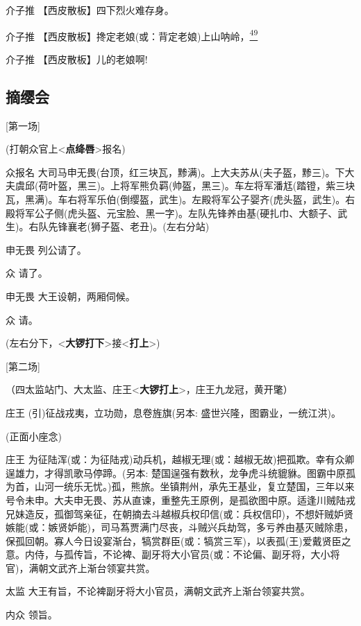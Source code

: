 介子推 【西皮散板】四下烈火难存身。

介子推
【西皮散板】搀定老娘(或：背定老娘)上山呐岭，\protect\hyperlink{fn49}{\textsuperscript{49}}

介子推 【西皮散板】儿的老娘啊!

\newpage
\hypertarget{ux6458ux7f28ux4f1a}{%
\subsection{摘缨会}\label{ux6458ux7f28ux4f1a}}

{[}第一场{]}

(打朝众官上\textless{}\textbf{点绛唇}\textgreater{}报名)

众报名
大司马申无畏(台顶，红三块瓦，黪满)。上大夫苏从(夫子盔，黪三)。下大夫虞邱(荷叶盔，黑三)。上将军熊负羁(帅盔，黑三)。车左将军潘尪(踏镫，紫三块瓦，黑满)。车右将军乐伯(倒缨盔，武生)。左殿将军公子婴齐(虎头盔，武生)。右殿将军公子侧(虎头盔、元宝脸、黑一字)。左队先锋养由基(硬扎巾、大额子、武生)。右队先锋襄老(狮子盔、老丑)。(左右分站)

申无畏 列公请了。

众 请了。

申无畏 大王设朝，两厢伺候。

众 请。

(左右分下，\textless{}\textbf{大锣打下}\textgreater{}接\textless{}\textbf{打上}\textgreater{})

{[}第二场{]}

（四太监站门、大太监、庄王\textless{}\textbf{大锣打上}\textgreater{}，庄王九龙冠，黄开氅）

庄王 (引)征战戎夷，立功勋，息卷旌旗(另本: 盛世兴隆，图霸业，一统江洪)。

(正面小座念)

庄王
为征陆浑(或：为征陆戎)动兵机，越椒无理(或：越椒无故)把孤欺。幸有众卿逞雄力，才得凯歌马停蹄。(另本:
楚国逞强有数秋，龙争虎斗统貔貅。图霸中原孤为首，山河一统乐无忧。)孤，熊旅。坐镇荆州，承先王基业，复立楚国，三年以来号令未申。大夫申无畏、苏从直谏，重整先王原例，是孤欲图中原。适逢川贼陆戎兄妹造反，孤御驾亲征，在朝摘去斗越椒兵权印信(或：兵权信印)，不想奸贼妒贤嫉能(或：嫉贤妒能)，司马蒍贾满门尽丧，斗贼兴兵劫驾，多亏养由基灭贼除患，保孤回朝。寡人今日设宴渐台，犒赏群臣(或：犒赏三军)，以表孤(王)爱戴贤臣之意。内侍，与孤传旨，不论裨、副牙将大小官员(或：不论偏、副牙将，大小将官)，满朝文武齐上渐台领宴共赏。

太监 大王有旨，不论裨副牙将大小官员，满朝文武齐上渐台领宴共赏。

内众 领旨。

